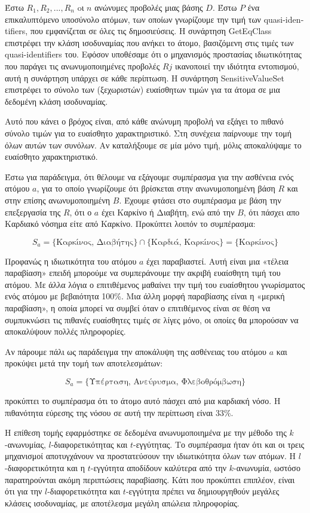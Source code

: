 Έστω $R_1,R_2,...,R_n$ oι $n$ ανώνυμες προβολές μιας βάσης $D$. Έστω $P$ ένα επικαλυπτόμενο υποσύνολο ατόμων, των οποίων γνωρίζουμε την τιμή των 
\textlatin{quasi-identifiers}, που εμφανίζεται σε όλες τις δημοσιεύσεις.
Η συνάρτηση \textlatin{GetEqClass} επιστρέφει την κλάση ισοδυναμίας που ανήκει το άτομο, βασιζόμενη στις τιμές των \textlatin{quasi-identifiers} του.
Εφόσον υποθέσαμε ότι ο μηχανισμός προστασίας ιδιωτικότητας που παράγει τις ανωνυμοποιημένες προβολές $Rj$ ικανοποιεί την ιδιότητα εντοπισμού, αυτή η συνάρτηση υπάρχει σε κάθε περίπτωση.
Η συνάρτηση \textlatin{SensitiveValueSet} επιστρέφει το σύνολο των (ξεχωριστών) ευαίσθητων τιμών για τα άτομα σε μια δεδομένη κλάση ισοδυναμίας.

Αυτό που κάνει ο βρόχος είναι, από κάθε ανώνυμη προβολή να εξάγει το πιθανό σύνολο τιμών για το ευαίσθητο χαρακτηριστικό. Στη συνέχεια παίρνουμε την τομή όλων αυτών των συνόλων. Αν καταλήξουμε σε μία μόνο τιμή, μόλις αποκαλύψαμε το ευαίσθητο χαρακτηριστικό.

Έστω για παράδειγμα, ότι θέλουμε να εξάγουμε συμπέρασμα για την ασθένεια ενός ατόμου $a$, για το οποίο γνωρίζουμε ότι βρίσκεται στην ανωνυμοποημένη βάση $R$ και στην επίσης ανωνυμοποιημένη $B$. Έχουμε φτάσει στο συμπέρασμα με βάση την επεξεργασία της $R$,  ότι ο $a$ έχει Καρκίνο ή Διαβήτη, ενώ από την $B$, ότι πάσχει απο Καρδιακό νόσημα είτε από Καρκίνο. Προκύπτει λοιπόν το συμπέρασμα:

$$S_a={\{\text{Καρκίνος, Διαβήτης}\}}\cap \{\text{Καρδιά, Καρκίνος}\}=\{\text{Καρκίνος}\}$$

Προφανώς η ιδιωτικότητα του ατόμου $a$ έχει παραβιαστεί. Αυτή είναι μια «τέλεια παραβίαση» επειδή μπορούμε να συμπεράνουμε την ακριβή ευαίσθητη τιμή του ατόμου. Με άλλα λόγια ο επιτιθέμενος μαθαίνει την τιμή του ευαίσθητου γνωρίσματος ενός ατόμου με βεβαιότητα 100\%. Μια άλλη μορφή παραβίασης είναι η «μερική παραβίαση», η οποία μπορεί να συμβεί όταν ο επιτιθέμενος είναι σε θέση να συμπυκνώσει τις πιθανές ευαίσθητες τιμές σε λίγες μόνο, οι οποίες θα μπορούσαν να αποκαλύψουν πολλές πληροφορίες. 

Αν πάρουμε πάλι ως παράδειγμα την αποκάλυψη της ασθένειας του ατόμου $a$ και προκύψει μετά την τομή των αποτελεσμάτων:

$$S_a={\{\text{Υπέρταση, Ανεύρυσμα, Φλεβοθρόμβωση}\}}$$

προκύπτει το συμπέρασμα ότι το άτομο αυτό πάσχει από μια καρδιακή νόσο. Η πιθανότητα εύρεσης της νόσου σε αυτή την περίπτωση είναι 33\%.


Η επίθεση τομής εφαρμόστηκε σε δεδομένα ανωνυμοποιημένα με την μέθοδο της $k$-ανωνυμίας, $l$-διαφορετικότητας και $t$-εγγύτητας. Το συμπέρασμα ήταν ότι και οι τρεις μηχανισμοί αποτυγχάνουν να προστατεύσουν την ιδιωτικότητα όλων των ατόμων. Η $l$-διαφορετικότητα και η $t$-εγγύτητα αποδίδουν καλύτερα από την $k$-ανωνυμία, ωστόσο παρατηρούνται ακόμη περιπτώσεις παραβίασης. 
Κάτι που προκύπτει επιπλέον, είναι ότι για την $l$-διαφορετικότητα και $t$-εγγύτητα πρέπει να δημιουργηθούν μεγάλες κλάσεις ισοδυναμίας, με αποτέλεσμα μεγάλη απώλεια πληροφορίας.

